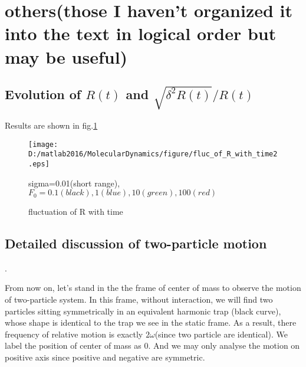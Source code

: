 \documentclass[aps,pre,twocolumn
,groupedaddress]{revtex4-1}
\begin{document}
 




\section{others(those I haven't organized it into the text in logical order but may be useful)}

\subsection{Evolution of $R(t)$ and $\sqrt{\delta^2R(t)}/R(t)$} 
Results are shown in fig.\ref{fig:others1}

\begin{figure}[hbtp]

\centering
\texttt{[image: D:/matlab2016/MolecularDynamics/figure/fluc\_of\_R\_with\_time2.eps]}
\caption{fluctuation of R with time }
sigma=0.01(short range), $F_0=0.1(black), 1(blue), 10(green) ,100(red)$
\label{fig:others1}
\end{figure}


\subsection{Detailed discussion of two-particle motion}
{\color{red}{This chapter previously follow the subsection ``two-particle case" in subsection ``Dynamics study" in section ``Thermalization". But then I found we haven't used these result. So I put it at the end for the time being}}.
  

From now on, let's stand in the the frame of center of mass to observe the motion of two-particle system. In this frame, without interaction, we will find two particles sitting symmetrically in an equivalent harmonic trap (black curve), whose shape is identical to the trap we see in the static frame. As a result, there frequency of relative motion is exactly $2\omega$(since two particle are identical). We label the position of center of mass as 0. And we may only analyse the motion on positive axis since positive and negative are symmetric. 
\end{document}
